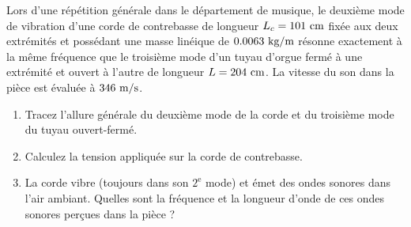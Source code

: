 Lors d'une répétition générale dans le département de musique, le deuxième mode de vibration d'une corde de contrebasse de longueur $L_c = 101\text{ cm}$ fixée aux deux extrémités et possédant une masse linéique de $0.0063\text{ kg/m}$ résonne exactement à la même fréquence que le troisième mode d'un tuyau d'orgue fermé à une extrémité et ouvert à l'autre de longueur $L = 204\text{ cm}$. La vitesse du son dans la pièce est évaluée à $346\text{ m/s}$.

\begin{enumerate}[label=\alph*)]
    \item Tracez l'allure générale du deuxième mode de la corde et du troisième mode du tuyau ouvert-fermé.
    \item Calculez la tension appliquée sur la corde de contrebasse.
    \item La corde vibre (toujours dans son $2^\text{e}$ mode) et émet des ondes sonores dans l'air ambiant. Quelles sont la fréquence et la longueur d'onde de ces ondes sonores perçues dans la pièce ?
\end{enumerate}